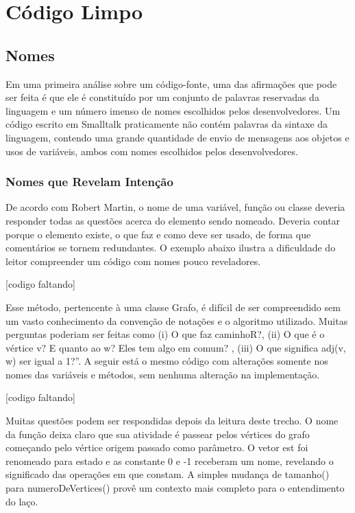 \chapter{Código Limpo}
\label{chap:codigolimpo}

\section{Nomes}
\label{sec:nomes}

	Em uma primeira análise sobre um código-fonte, uma das afirmações que pode ser feita é que ele é constituído por um conjunto de palavras reservadas da linguagem e um número imenso de nomes escolhidos pelos desenvolvedores. Um código escrito em Smalltalk praticamente não contém palavras da sintaxe da linguagem, contendo uma grande quantidade de envio de mensagens aos objetos e usos de variáveis, ambos com nomes escolhidos pelos desenvolvedores.

\subsection{Nomes que Revelam Intenção}
	De acordo com Robert Martin, o nome de uma variável, função ou classe deveria responder todas as questões acerca do elemento sendo nomeado. Deveria contar porque o elemento existe, o que faz e como deve ser usado, de forma que comentários se tornem redundantes. O exemplo abaixo ilustra a dificuldade do leitor compreender um código com nomes pouco reveladores.

[codigo faltando]

					Esse método, pertencente à uma classe Grafo, é difícil de ser compreendido sem um vasto conhecimento da convenção de notações e o algoritmo utilizado. Muitas perguntas poderiam ser feitas como (i) O que faz caminhoR?,  (ii) O que é o vértice v?  E quanto ao w? Eles tem algo em comum? , (iii)  O que significa adj(v, w) ser igual a 1?”.
					A seguir está o mesmo código com alterações somente nos nomes das variáveis e métodos, sem nenhuma alteração na implementação.

[codigo faltando]

	Muitas questões podem ser respondidas depois da leitura deste trecho. O nome da função deixa claro que sua atividade é passear pelos vértices do grafo começando pelo vértice origem passado como parâmetro. O vetor est foi renomeado para estado e as constante 0 e -1 receberam um nome, revelando o significado das operações em que constam. A simples mudança de tamanho() para numeroDeVertices() provê um contexto mais completo para o entendimento do laço.
	

